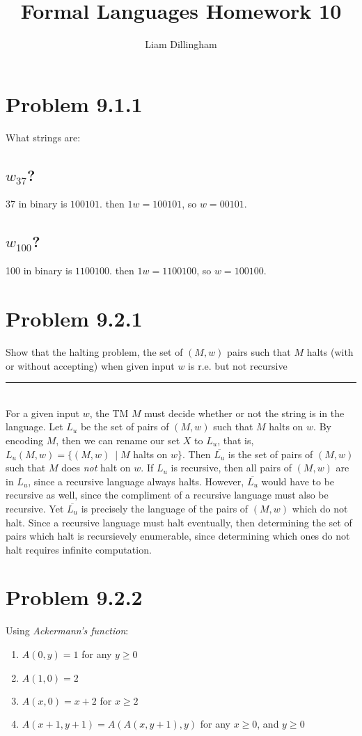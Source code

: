 \documentclass[20pt]{article} %
\title{Formal Languages Homework 10}
\author{Liam Dillingham}
\begin{document}
\maketitle

\section{Problem 9.1.1}
What strings are:
\subsection{$w_{37}$?}
37 in binary is $100101$. then $1w = 100101$, so $w = 00101$.
\subsection{$w_{100}$?}
100 in binary is $1100100$. then $1w = 1100100$, so $w = 100100$.
\section{Problem 9.2.1}
Show that the halting problem, the set of $(M,w)$ pairs such that $M$ halts (with or without accepting) when given input $w$ is r.e. but not recursive \\
\noindent\rule{2cm}{0.4pt} \\
For a given input $w$, the TM $M$ must decide whether or not the string is in the language. Let $L_u$ be the set of pairs of $(M,w)$ such that $M$ halts on $w$.  By encoding $M$, then we can rename our set $X$ to $L_u$, that is, $L_u(M,w) = \{ (M,w) \ \mid M$ halts on $w \}$.  Then $\overline{L_u}$ is the set of pairs of $(M,w)$ such that $M$ does \textit{not} halt on $w$.  If $L_u$ is recursive, then all pairs of $(M,w)$ are in $L_u$, since a recursive language always halts.  However, $\overline{L_u}$ would have to be recursive as well, since the compliment of a recursive language must also be recursive.  Yet $\overline{L_u}$ is precisely the language of the pairs of $(M,w)$ which do not halt.  Since a recursive language must halt eventually, then determining the set of pairs which halt is recursievely enumerable, since determining which ones do not halt requires infinite computation.
\newpage
\section{Problem 9.2.2}
Using \textit{Ackermann's function}:
\begin{enumerate}
\item $A(0,y)=1$ for any $y \geq 0$
\item $A(1,0)=2$
\item $A(x,0)=x+2$ for $x \geq 2$
\item $A(x+1,y+1)=A(A(x,y+1),y)$ for any $x \geq 0$, and $y \geq 0$
\end{enumerate}
\end{document}

